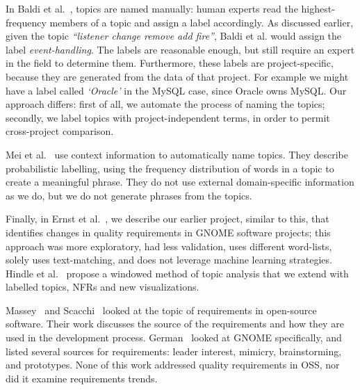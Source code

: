 \documentclass[smallextended]{svjour3}       %
\begin{document}
In Baldi et al.~\cite{Baldi2008}, topics are named manually: human
experts read the highest-frequency members of a topic and assign a
label accordingly. 
As discussed earlier, given the topic \emph{``listener change remove add fire''}, Baldi et al. would assign the label \emph{event-handling}. 
The labels are reasonable enough, but still require an expert in the field to determine them. 
Furthermore, these labels are project-specific, because they are
generated from the data of that project. For example we might have a label called \emph{`Oracle'}
in the MySQL case, since Oracle owns MySQL. 
Our approach differs: first of all, we automate the process of naming the topics; secondly, we label topics with project-independent terms, in order
to permit cross-project comparison.

Mei et al.~\cite{Mei2007} use context information to automatically name topics. 
They describe probabilistic labelling, using the frequency distribution of words in a topic to create a meaningful phrase. 
They do not use external domain-specific information as we do, but we
do not generate phrases from the topics.

Finally, in Ernst et al.~\cite{ernst10refsq}, we describe our earlier
project, similar to this, that identifies changes in quality requirements
in GNOME software projects; this approach was more exploratory, had
less validation, uses different word-lists, solely uses text-matching,
and does not leverage machine learning strategies. 
Hindle et al.~\cite{Hindle09ICSM} propose a windowed method of topic
analysis that we extend with labelled
topics, NFRs and new visualizations.

Massey~\cite{massey02icse} and Scacchi~\cite{scacchi05b} looked at the topic of requirements in open-source software. 
Their work discusses the source of the requirements and how they are used in the development process. 
 German~\cite{german03gnome} looked at GNOME specifically, and listed several sources for requirements: leader interest, mimicry, brainstorming, and prototypes. 
None of this work  addressed quality requirements in OSS, nor did it examine requirements trends.
\end{document}
